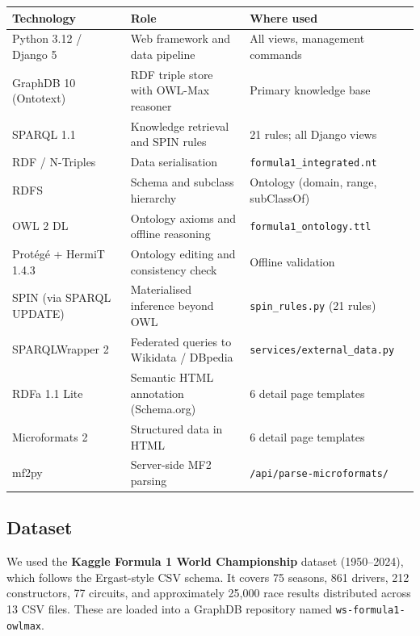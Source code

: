 \documentclass[12pt,a4paper]{article}
\begin{document}
\begin{center}
\begin{tabularx}{\linewidth}{@{}lXp{4.5cm}@{}}
\toprule
\textbf{Technology} & \textbf{Role} & \textbf{Where used} \\
\midrule
Python 3.12 / Django 5    & Web framework and data pipeline            & All views, management commands \\
GraphDB 10 (Ontotext)     & RDF triple store with OWL-Max reasoner     & Primary knowledge base \\
SPARQL 1.1                & Knowledge retrieval and SPIN rules         & 21 rules; all Django views \\
RDF / N-Triples           & Data serialisation                         & \texttt{formula1\_integrated.nt} \\
RDFS                      & Schema and subclass hierarchy              & Ontology (domain, range, subClassOf) \\
OWL 2 DL                  & Ontology axioms and offline reasoning      & \texttt{formula1\_ontology.ttl} \\
Protégé + HermiT 1.4.3    & Ontology editing and consistency check     & Offline validation \\
SPIN (via SPARQL UPDATE)  & Materialised inference beyond OWL          & \texttt{spin\_rules.py} (21 rules) \\
SPARQLWrapper 2           & Federated queries to Wikidata / DBpedia    & \texttt{services/external\_data.py} \\
RDFa 1.1 Lite             & Semantic HTML annotation (Schema.org)      & 6 detail page templates \\
Microformats 2            & Structured data in HTML                    & 6 detail page templates \\
mf2py                     & Server-side MF2 parsing                    & \texttt{/api/parse-microformats/} \\
\bottomrule
\end{tabularx}
\end{center}

\subsection{Dataset}

We used the \textbf{Kaggle Formula 1 World Championship} dataset (1950--2024),
which follows the Ergast-style CSV schema.
It covers 75 seasons, 861 drivers, 212 constructors, 77 circuits, and approximately 25{,}000 race results
distributed across 13 CSV files. These are loaded into a GraphDB repository named \texttt{ws-formula1-owlmax}.
\end{document}

